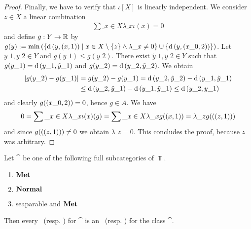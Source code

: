 \begin{proof}
	
	Finally, we have to verify that $\iota[X]$ is linearly independent. We consider $z \in X$ a linear combination 
	\begin{align*}
		\sum\_{x \in X} \lambda\_x \iota(x) = 0
	\end{align*}
	and define $g: Y \to \mathbb R$ by $g(y) := \min{\left ( {\left \{ \operatorname{d}{\left ( y, (x, 1) \right )} \mid x \in X \setminus \{z\} \land \lambda\_x \neq 0 \right \}} \cup {\left \{ \operatorname{d}{\left ( y, {\left ( x\_0, 2 \right )} \right )} \right \}} \right )}$. Let $y\_1, y\_2 \in Y$ and \Wlog $g(y\_1) \leq g(y\_2)$. There exist $\tilde{y}\_1, \tilde{y}\_2 \in Y$ such that $g(y\_1) = \operatorname{d}{\left ( y\_1, \tilde{y}\_1 \right )}$ and $g(y\_2) = \operatorname{d}{\left ( y\_2, \tilde{y}\_2 \right )}$. We obtain
	\begin{align*}
		{\left | g(y\_2) - g(y\_1) \right |} &= g(y\_2) - g(y\_1) = \operatorname{d}{\left ( y\_2, \tilde{y}\_2 \right )} - \operatorname{d}{\left ( y\_1, \tilde{y}\_1 \right )} \\
		&\leq \operatorname{d}{\left ( y\_2, \tilde{y}\_1 \right )} - \operatorname{d}{\left ( y\_1, \tilde{y}\_1 \right )} \leq \operatorname{d}{\left ( y\_2, y\_1 \right )}
	\end{align*}
	and clearly $g{\left ( {\left ( x\_0, 2 \right )} \right )} = 0$, hence $g \in A$. We have
	\begin{align*}
		0 = \sum\_{x \in X} \lambda\_x \iota(x)(g) = \sum\_{x \in X} \lambda\_x g{\left ( {\left ( x, 1 \right )} \right )} = \lambda\_z g({\left ( {\left ( z, 1 \right )} \right )})
	\end{align*}
	and since $g({\left ( {\left ( z, 1 \right )} \right )}) \neq 0$ we obtain $\lambda\_z = 0$. This concludes the proof, because $z$ was arbitrary.  
\end{proof}

\begin{theorem}\cite[p. 84]{ToR} \label{theorem:anr\_to\_ane}
	Let $\cat$ be one of the following full subcategories of $\Top$.
	\begin{enumerate}
		\item $\mathbf{Met}$
		\item $\mathbf{Normal}$
		\item seaparable and $\mathbf{Met}$
	\end{enumerate}
	Then every \anr\ (resp. \ar) for $\cat$ is an \ane\ (resp. \aex) for the class $\cat$. 
\end{theorem}